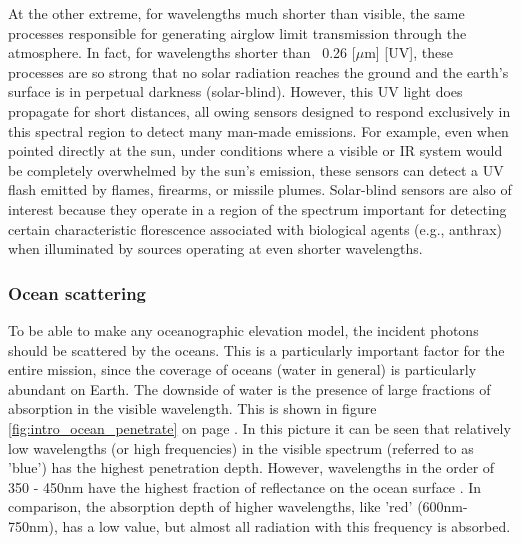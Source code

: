 At the other extreme, for wavelengths much shorter than visible, the same processes responsible for generating airglow limit transmission through the atmosphere. In fact, for wavelengths shorter than ~0.26 [$\mu$m] [\ac{UV}], these processes are so strong that no solar radiation reaches the ground and the earth's surface is in perpetual darkness (solar-blind). However, this \acs{UV} light does propagate for short distances, all owing sensors designed to respond exclusively in this spectral region to detect many man-made emissions. For example, even when pointed directly at the sun, under conditions where a visible or \ac{IR} system would be completely overwhelmed by the sun's emission, these sensors can detect a UV flash emitted by flames, firearms, or missile plumes. Solar-blind sensors are also of interest because they operate in a region of the spectrum important for detecting certain characteristic florescence associated with biological agents (e.g., anthrax) when illuminated by sources operating at even shorter wavelengths. 

\subsubsection{Ocean scattering}
\label{introOcean}
To be able to make any oceanographic elevation model, the incident photons should be scattered by the oceans. This is a particularly important factor for the entire mission, since the coverage of oceans (water in general) is particularly abundant on Earth. The downside of water is the presence of large fractions of absorption in the visible wavelength. This is shown in figure \ref{fig:intro_ocean_penetrate} on page \pageref{fig:intro_ocean_penetrate}. In this picture it can be seen that relatively low wavelengths (or high frequencies) in the visible spectrum (referred to as 'blue') has the highest penetration depth. However, wavelengths in the order of 350 - 450nm have the highest fraction of reflectance on the ocean surface \cite{ocean_scattering}. In comparison, the absorption depth of higher wavelengths, like 'red' (600nm-750nm), has a low value, but almost all radiation with this frequency is absorbed. 

